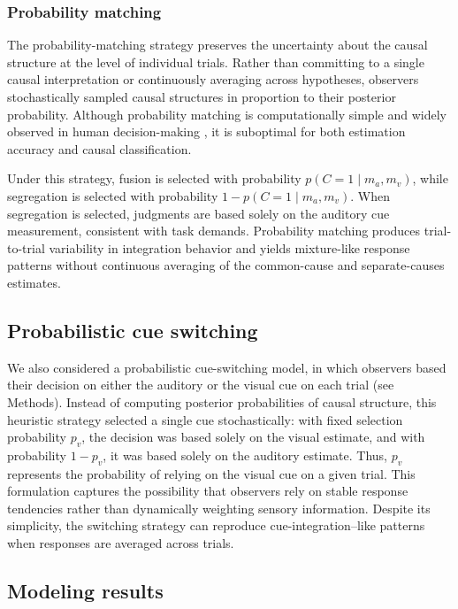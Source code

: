 \documentclass[9pt,lineno,doublespacing]{elife}
\begin{document}
\subsubsection{Probability matching}
The probability-matching strategy preserves the uncertainty about the causal structure at the level of individual trials. Rather than committing to a single causal interpretation or continuously averaging across hypotheses, observers stochastically sampled causal structures in proportion to their posterior probability. Although probability matching is computationally simple and widely observed in human decision-making \citep{wozny2010probability,ren2020ensemble}, it is suboptimal for both estimation accuracy and causal classification.

Under this strategy, fusion is selected with probability $p(C=1 \mid m_a,m_v)$, while segregation is selected with probability $1 - p(C=1 \mid m_a,m_v)$. When segregation is selected, judgments are based solely on the auditory cue measurement, consistent with task demands. Probability matching produces trial-to-trial variability in integration behavior and yields mixture-like response patterns without continuous averaging of the common-cause and separate-causes estimates.

\subsection{Probabilistic cue switching}
We also considered a probabilistic cue-switching model, in which observers based their decision on either the auditory or the visual cue on each trial (see Methods). Instead of computing posterior probabilities of causal structure, this heuristic strategy selected a single cue stochastically: with fixed selection probability $p_v$, the decision was based solely on the visual estimate, and with probability $1 - p_v$, it was based solely on the auditory estimate. Thus, $p_v$ represents the probability of relying on the visual cue on a given trial. This formulation captures the possibility that observers rely on stable response tendencies rather than dynamically weighting sensory information. Despite its simplicity, the switching strategy can reproduce cue-integration–like patterns when responses are averaged across trials.




\subsection{Modeling results}
\end{document}
